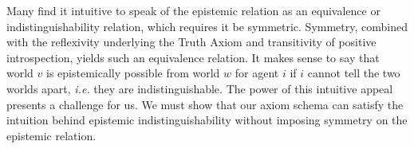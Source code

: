 


Many find it intuitive to speak of the epistemic relation as an equivalence or indistinguishability relation, which requires it be symmetric. Symmetry, combined with the reflexivity underlying the Truth Axiom and transitivity of positive introspection, yields such an equivalence relation. It makes sense to say that world $v$ is epistemically possible from world $w$ for agent $i$ if $i$ cannot tell the two worlds apart, \emph{i.e.} they are indistinguishable. The power of this intuitive appeal presents a challenge for us. We must show that our axiom schema can satisfy the intuition behind epistemic indistinguishability without imposing symmetry on the epistemic relation.

